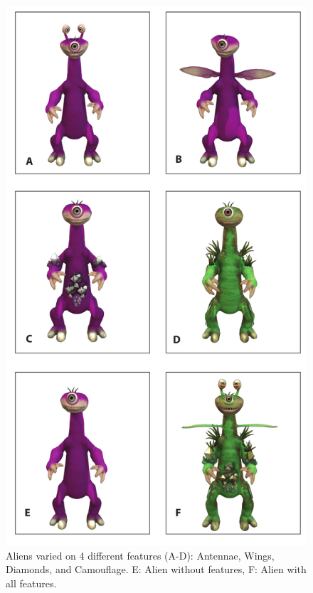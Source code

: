 \documentclass[10pt,letterpaper]{article}
\begin{document}
\begin{figure}[htb!]
		\centering
	\caption{Aliens varied on 4 different features (A-D): Antennae, Wings, Diamonds, and Camouflage. E: Alien without features, F: Alien with all features.}
	\label{Alien_features}
		\includegraphics[scale=0.3]{aliens.png}
\end{figure}
\end{document}
